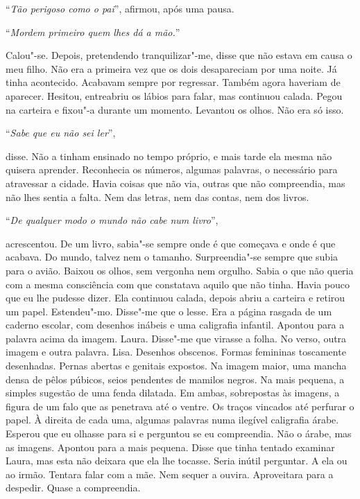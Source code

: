 ``\emph{Tão perigoso como o pai}'',
afirmou, após uma pausa.

``\emph{Mordem primeiro quem lhes dá a mão.}''

Calou"-se. Depois, pretendendo tranquilizar"-me, disse que não estava em
causa o meu filho. Não era a primeira vez que os dois desapareciam por
uma noite. Já tinha acontecido. Acabavam sempre por regressar. Também
agora haveriam de aparecer. Hesitou, entreabriu os lábios para falar,
mas continuou calada. Pegou na carteira e fixou"-a durante um momento.
Levantou os olhos. Não era só isso.

``\emph{Sabe que eu não sei ler}'',

disse. Não a tinham ensinado no tempo próprio, e mais tarde ela mesma
não quisera aprender. Reconhecia os números, algumas palavras, o
necessário para atravessar a cidade. Havia coisas que não via, outras
que não compreendia, mas não lhes sentia a falta. Nem das letras, nem
das contas, nem dos livros.

``\emph{De qualquer modo o mundo não cabe num livro}'',

acrescentou. De um livro, sabia"-se sempre onde é que começava e onde é
que acabava. Do mundo, talvez nem o tamanho. Surpreendia"-se sempre que
subia para o avião. Baixou os olhos, sem vergonha nem orgulho. Sabia o
que não queria com a mesma consciência com que constatava aquilo que não
tinha. Havia pouco que eu lhe pudesse dizer. Ela continuou calada,
depois abriu a carteira e retirou um papel. Estendeu"-mo. Disse"-me que
o lesse. Era a página rasgada de um caderno escolar, com desenhos
inábeis e uma caligrafia infantil. Apontou para a palavra acima da
imagem. Laura. Disse"-me que virasse a folha. No verso, outra imagem e
outra palavra. Lisa. Desenhos obscenos. Formas femininas toscamente
desenhadas. Pernas abertas e genitais expostos. Na imagem maior, uma
mancha densa de pêlos púbicos, seios pendentes de mamilos negros. Na
mais pequena, a simples sugestão de uma fenda dilatada. Em ambas,
sobrepostas às imagens, a figura de um falo que as penetrava até o
ventre. Os traços vincados até perfurar o papel. À direita de cada uma,
algumas palavras numa ilegível caligrafia árabe. Esperou que eu olhasse
para si e perguntou se eu compreendia. Não o árabe, mas as imagens.
Apontou para a mais pequena. Disse que tinha tentado examinar Laura, mas
esta não deixara que ela lhe tocasse. Seria inútil perguntar. A ela ou
ao irmão. Tentara falar com a mãe. Nem sequer a ouvira. Aproveitara para
a despedir. Quase a compreendia.

